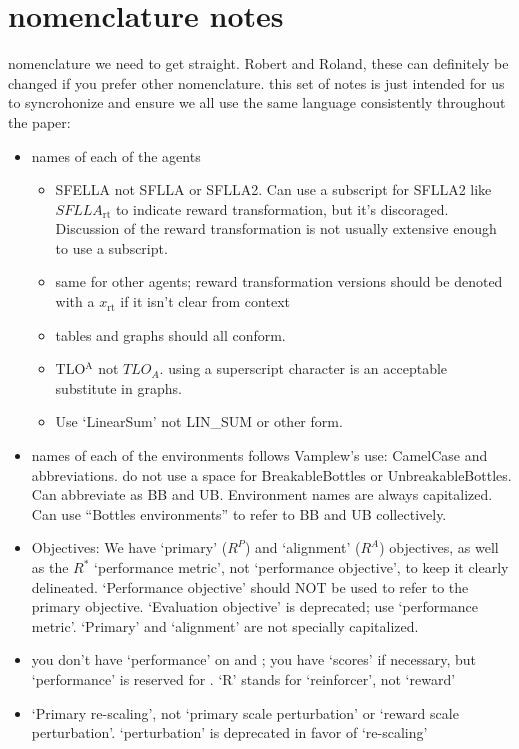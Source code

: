 \section*{nomenclature notes}
nomenclature we need to get straight. Robert and Roland, these can definitely be changed if you prefer other nomenclature. this set of notes is just intended for us to syncrohonize and ensure we all use the same language consistently throughout the paper:

\begin{itemize}
    \item names of each of the agents
        \begin{itemize}
            \item SFELLA not SFLLA or SFLLA2. Can use a subscript for SFLLA2 like $SFLLA_{\text{rt}}$ to indicate reward transformation, but it's discoraged. Discussion of the reward transformation is not usually extensive enough to use a subscript. 
            \item same for other agents; reward transformation versions should be denoted with a $x_{\text{rt}}$ if it isn't clear from context
            \item tables and graphs should all conform.
            \item TLO$^\text{A}$ not $TLO_A$. using a superscript character is an acceptable substitute in graphs.
            \item Use `LinearSum' not LIN\_SUM or other form.
        \end{itemize}
    \item names of each of the environments follows Vamplew's use: CamelCase and abbreviations. do not use a space for BreakableBottles or UnbreakableBottles. Can abbreviate as BB and UB. Environment names are always capitalized. Can use ``Bottles environments'' to refer to BB and UB collectively.
    \item Objectives: We have `primary' ($R^P$) and `alignment' ($R^A$) objectives, as well as the $R^*$ `performance metric', not `performance objective', to keep it clearly delineated. `Performance objective' should NOT be used to refer to the primary objective. `Evaluation objective' is deprecated; use `performance metric'. `Primary' and `alignment' are not specially capitalized.
    \item you don't have `performance' on \RA{} and \RP{}; you have `scores' if necessary, but `performance' is reserved for \RStar{}. `R' stands for `reinforcer', not `reward'
    \item `Primary re-scaling', not `primary scale perturbation' or `reward scale perturbation'. `perturbation' is deprecated in favor of `re-scaling'

\end{itemize}
